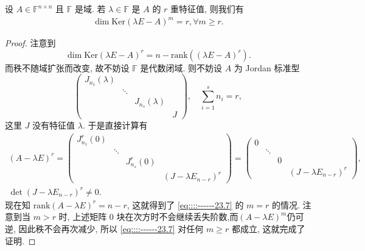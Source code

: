 \documentclass[../../main.tex]{subfiles}
\begin{document}
\begin{lemma}[根子空间维数]\label{lemma:根子空间维数}
设 \( A \in \mathbb{F}^{n \times n} \) 且 \( \mathbb{F} \) 是域. 若 \( \lambda \in \mathbb{F} \) 是 \( A \) 的 \( r \) 重特征值, 则我们有
\begin{align}
\dim \mathrm{Ker} \left( \lambda E - A \right)^m = r, \forall m \geqslant r. \label{eq::::------23.7}
\end{align}
\end{lemma}
\begin{proof}
注意到
\[
\dim \mathrm{Ker} \left( \lambda E - A \right)^r = n - \mathrm{rank} \left( \left( \lambda E - A \right)^r \right).
\]
而秩不随域扩张而改变, 故不妨设 \( \mathbb{F} \) 是代数闭域. 则不妨设 \( A \) 为 Jordan 标准型
\[
\begin{pmatrix}
J_{n_1} \left( \lambda \right) & & & \\
& \ddots & & \\
& & J_{n_s} \left( \lambda \right) & \\
& & & J
\end{pmatrix}, \quad \sum_{i=1}^s n_i = r,
\]
这里 \( J \) 没有特征值 \( \lambda \). 于是直接计算有
\begin{gather*}
\left( A - \lambda E \right)^r = \begin{pmatrix}
J_{n_1}^r \left( 0 \right) & & & \\
& \ddots & & \\
& & J_{n_s}^r \left( 0 \right) & \\
& & & \left( J - \lambda E_{n-r} \right)^r
\end{pmatrix} = \begin{pmatrix}
0 & & & \\
& \ddots & & \\
& & 0 & \\
& & & \left( J - \lambda E_{n-r} \right)^r
\end{pmatrix}, 
\\
\det \left( J - \lambda E_{n-r} \right)^r \neq 0.
\end{gather*}
现在知 \( \mathrm{rank} \left( A - \lambda E \right)^r = n - r \), 这就得到了 \eqref{eq::::------23.7} 的 \( m = r \) 的情况. 注意到当 \( m > r \) 时, 上述矩阵 \( 0 \) 块在次方时不会继续丢失阶数,而$\left( A - \lambda E \right)^m$仍可逆, 因此秩不会再次减少, 所以 \eqref{eq::::------23.7} 对任何 \( m \geqslant r \) 都成立, 这就完成了证明.
\end{proof}
\end{document}
